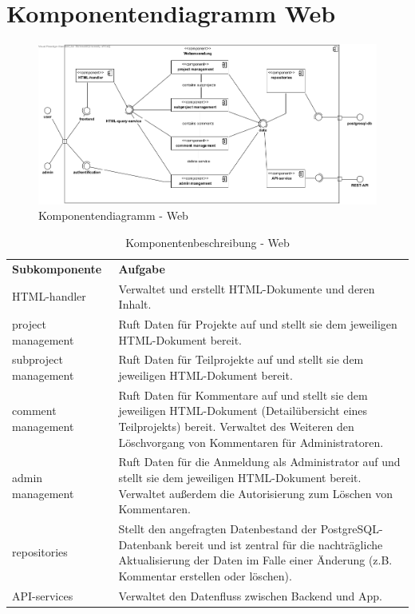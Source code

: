 \section{Komponentendiagramm Web}

\begin{figure}[H]
	\centering
	\includegraphics[width=\textwidth]{img/componentweb.png}	
	\caption{Komponentendiagramm - Web}
	\label{fig:komponentendiagramm-a}
\end{figure}

\begin{table}[H]
	\centering
	\begin{tabularx}{\textwidth}{X X}
		\rowcolor[HTML]{C0C0C0} 
		\textbf{Subkomponente} & \textbf{Aufgabe} \\
		HTML-handler & Verwaltet und erstellt HTML-Dokumente und deren Inhalt. \\
		\rowcolor[HTML]{E7E7E7}
		project management & Ruft Daten für Projekte auf und stellt sie dem jeweiligen HTML-Dokument bereit.   \\
		 subproject management &  Ruft Daten für Teilprojekte auf und stellt sie dem jeweiligen HTML-Dokument bereit. \\
		 \rowcolor[HTML]{E7E7E7}
		comment management & Ruft Daten für Kommentare auf und stellt sie dem jeweiligen HTML-Dokument (Detailübersicht eines Teilprojekts) bereit. Verwaltet des Weiteren den Löschvorgang von Kommentaren für Administratoren. \\
		admin management & Ruft Daten für die Anmeldung als Administrator auf und stellt sie dem jeweiligen HTML-Dokument bereit. Verwaltet außerdem die Autorisierung zum Löschen von Kommentaren.   \\
		\rowcolor[HTML]{E7E7E7}
		repositories & Stellt den angefragten Datenbestand der PostgreSQL-Datenbank bereit und ist zentral für die nachträgliche Aktualisierung der Daten im Falle einer Änderung (z.B. Kommentar erstellen oder löschen). \\
		API-services & Verwaltet den Datenfluss zwischen Backend und App. \\
		
	\end{tabularx}
	\caption{Komponentenbeschreibung - Web}
	\label{table:komponentenbeschreibung-web}
\end{table}


